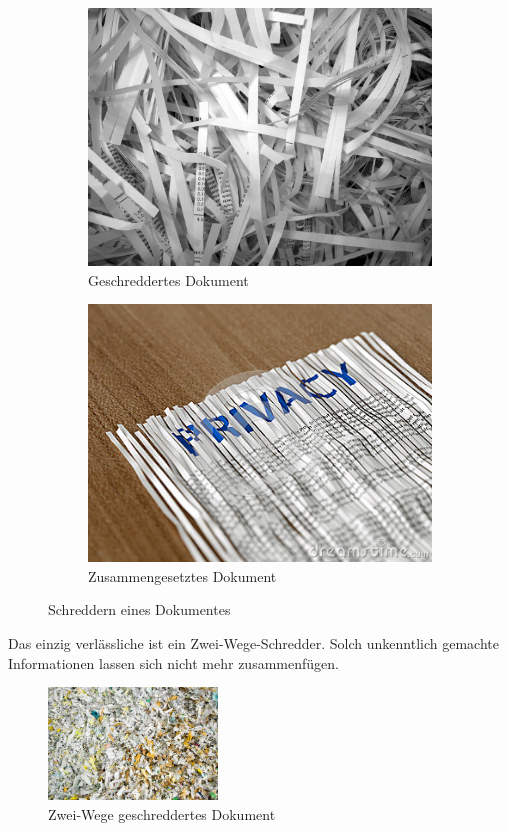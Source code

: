 \begin{figure}[htb]
  \begin{subfigure}[b]{.45\linewidth}
    \centering
    \includegraphics[width=0.5\linewidth]{images/shredded-paper.jpg}
    \caption{Geschreddertes Dokument}
    \label{fig:socialengineering:informationssammlung:quellen:schreddern:subfigures:a}
  \end{subfigure}%
  \begin{subfigure}[b]{.45\linewidth}
    \centering
    \includegraphics[width=0.5\linewidth]{images/reassembled-shredded-paper.jpg}
    \caption{Zusammengesetztes Dokument}
    \label{fig:socialengineering:informationssammlung:quellen:schreddern:subfigures:b}
  \end{subfigure}
  \caption{Schreddern eines Dokumentes}
  \label{fig:socialengineering:informationssammlung:quellen:schreddern:figures}
\end{figure}

Das einzig verlässliche ist ein Zwei-Wege-Schredder. Solch unkenntlich gemachte Informationen lassen sich nicht mehr zusammenfügen.

\begin{figure}[H]
  \centering
  \includegraphics[width=0.4\textwidth]{images/two-way-shredded-paper.jpg}
  \caption[Test image for television]{Zwei-Wege geschreddertes Dokument}
  \label{fig:socialengineering:informationssammlung:quellen:zwei-wege-schreddern}
\end{figure}

